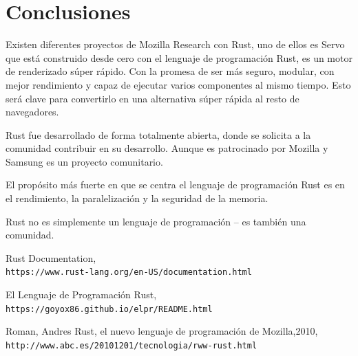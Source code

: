 \documentclass[journal]{IEEEtran}
\begin{document}
\section{Conclusiones}
Existen diferentes proyectos de Mozilla Research con Rust, uno de ellos es Servo que está construido desde cero con el lenguaje de programación Rust, es un motor de renderizado súper rápido. Con la promesa de ser más seguro, modular, con mejor rendimiento y capaz de ejecutar varios componentes al mismo tiempo. Esto será clave para 
convertirlo en una alternativa súper rápida al resto de navegadores.

\vspace{2mm}
Rust fue desarrollado de forma totalmente abierta, donde se solicita a la comunidad contribuir en su desarrollo. Aunque es patrocinado por Mozilla y Samsung es un proyecto comunitario.

\vspace{2mm}
El propósito más fuerte en que se centra el lenguaje de programación Rust es en el rendimiento, la paralelización y la seguridad de la memoria.

\vspace{2mm}
Rust no es simplemente un lenguaje de programación – es también una comunidad.



\begin{thebibliography}{1}
  
Rust Documentation,
\\\texttt{https://www.rust-lang.org/en-US/documentation.html}
  
El Lenguaje de Programación Rust,
\\\texttt{https://goyox86.github.io/elpr/README.html}

Roman, Andres Rust, el nuevo lenguaje de programación de Mozilla,2010,
\\\texttt{http://www.abc.es/20101201/tecnologia/rww-rust.html}
  
  
  

\end{thebibliography}
\end{document}
